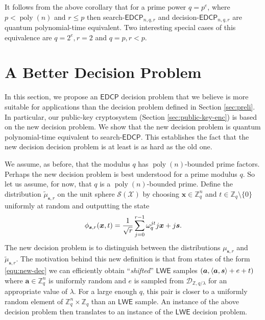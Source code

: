\documentclass[11pt]{article}
\theoremstyle{plain}
\theoremstyle{definition}
\DeclareMathOperator{\poly}{poly}
\let\ket\relax
\DeclarePairedDelimiter{\ket}{\lvert}{\rangle}
\DeclarePairedDelimiter{\lrang}{\langle}{\rangle}
\def\Z{\mathbb{Z}}
\def\lwe{\mathsf{LWE}}
\def\edcp{\mathsf{EDCP}}
\def\SX{\mathcal{S(X)}}
\begin{document}
It follows from the above corollary that for a prime power $q = p^e$, where $p < \poly(n)$ and $r \le p$ then search-$\edcp_{n, q, r}$ and decision-$\edcp_{n, q, r}$ are quantum polynomial-time equivalent. Two interesting special cases of this equivalence are $q = 2^e, r = 2$ and $q = p, r < p$.






\section{A Better Decision Problem}
\label{sec:new-decsn}

In this section, we propose an $\edcp$ decision problem that we believe is more suitable for applications than the decision problem defined in Section \ref{sec:preli}. In particular, our public-key cryptosystem (Section \ref{sec:public-key-enc}) is based on the new decision problem. We show that the new decision problem is quantum polynomial-time equivalent to search-$\edcp$. This establishes the fact that the new decision decision problem is at least is as hard as the old one.

We assume, as before, that the modulus $q$ has $\poly(n)$-bounded prime factors. Perhaps the new decision problem is best understood for a prime modulus $q$. So let us assume, for now, that $q$ is a $\poly(n)$-bounded prime. Define the distribution $\tilde{\mu}_{\bm{s}, r}$ on the unit sphere $\SX$ by choosing $\bm{x} \in \Z_q^n$ and $t \in \Z_q {\setminus} \{ 0 \}$ uniformly at random and outputting the state
\begin{equation}
    \label{equ:new-dec}
    \ket{\phi_{\bm{s}, r}(\bm{x}, t)} = \frac{1}{\sqrt{r}} \sum_{j = 0}^{r - 1} \omega_q^{jt} \ket{j}\ket{\bm{x} + j\bm{s}}.
\end{equation}
The new decision problem is to distinguish between the distributions $\mu_{\bm{s}, r}$ and $\tilde{\mu}_{\bm{s}, r}$. The motivation behind this new definition is that from states of the form \eqref{equ:new-dec} we can efficiently obtain ``\textit{shifted}'' $\lwe$ samples $(\bm{a}, \lrang{\bm{a}, \bm{s}} + e + t)$ where $\bm{a} \in \Z_q^n$ is uniformly random and $e$ is sampled from $\mathcal{D}_{\Z, q / \lambda}$ for an appropriate value of $\lambda$. For a large enough $q$, this pair is closer to a uniformly random element of $\Z_q^n \times \Z_q$ than an $\lwe$ sample. An instance of the above decision problem then translates to an instance of the $\lwe$ decision problem.
\end{document}
